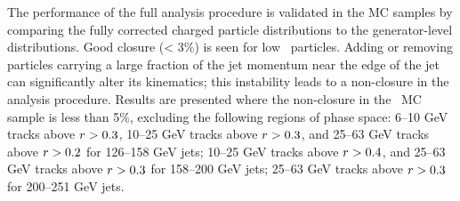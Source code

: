 The performance of the full analysis procedure is validated in the MC samples by comparing the fully corrected charged particle distributions to the generator-level distributions. Good closure (< 3\%) is seen for low \pt\ particles. 
Adding or removing particles carrying a large fraction of the jet momentum near the edge of the jet can significantly alter its
kinematics; this instability leads to a non-closure in the analysis procedure.
Results are presented where the non-closure in the \pp\ MC sample is less than 5\%, excluding the following regions of phase space: 6--10 GeV tracks above $\mbox{$r$} > 0.3$, 10--25 GeV tracks above $\mbox{$r$} > 0.3$, and 25--63 GeV tracks above $\mbox{$r$} > 0.2$ for 126--158 GeV jets; 10--25 GeV tracks above $\mbox{$r$} > 0.4$, and 25--63 GeV tracks above $\mbox{$r$} > 0.3$ for 158--200 GeV jets; 25--63 GeV tracks above $\mbox{$r$} > 0.3$ for 200--251 GeV jets.



